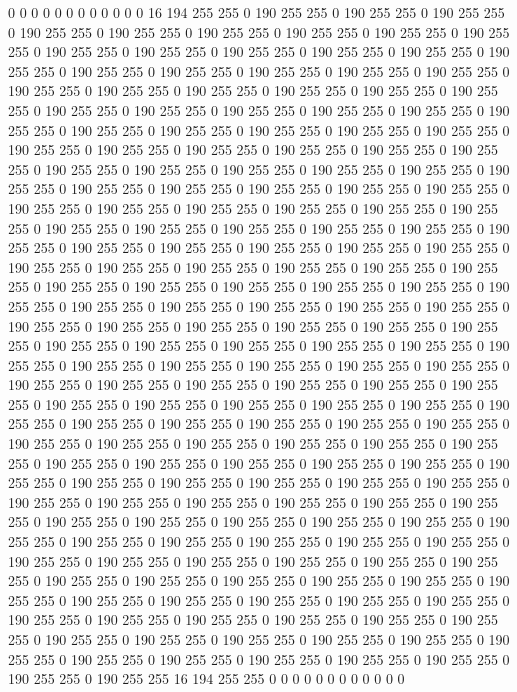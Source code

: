 0 0 0 0 0 0 0 0 0 0 0 0 16 194 255 255 0 190 255 255 0 190 255 255 0 190 255 255 0 190 255 255 0 190 255 255 0 190 255 255 0 190 255 255 0 190 255 255 0 190 255 255 0 190 255 255 0 190 255 255 0 190 255 255 0 190 255 255 0 190 255 255 0 190 255 255 0 190 255 255 0 190 255 255 0 190 255 255 0 190 255 255 0 190 255 255 0 190 255 255 0 190 255 255 0 190 255 255 0 190 255 255 0 190 255 255 0 190 255 255 0 190 255 255 0 190 255 255 0 190 255 255 0 190 255 255 0 190 255 255 0 190 255 255 0 190 255 255 0 190 255 255 0 190 255 255 0 190 255 255 0 190 255 255 0 190 255 255 0 190 255 255 0 190 255 255 0 190 255 255 0 190 255 255 0 190 255 255 0 190 255 255 0 190 255 255 0 190 255 255 
0 190 255 255 0 190 255 255 0 190 255 255 0 190 255 255 0 190 255 255 0 190 255 255 0 190 255 255 0 190 255 255 0 190 255 255 0 190 255 255 0 190 255 255 0 190 255 255 0 190 255 255 0 190 255 255 0 190 255 255 0 190 255 255 0 190 255 255 0 190 255 255 0 190 255 255 0 190 255 255 0 190 255 255 0 190 255 255 0 190 255 255 0 190 255 255 0 190 255 255 0 190 255 255 0 190 255 255 0 190 255 255 0 190 255 255 0 190 255 255 0 190 255 255 0 190 255 255 0 190 255 255 0 190 255 255 0 190 255 255 0 190 255 255 0 190 255 255 0 190 255 255 0 190 255 255 0 190 255 255 0 190 255 255 0 190 255 255 0 190 255 255 0 190 255 255 0 190 255 255 0 190 255 255 0 190 255 255 0 190 255 255 0 190 255 255 0 190 255 255 
0 190 255 255 0 190 255 255 0 190 255 255 0 190 255 255 0 190 255 255 0 190 255 255 0 190 255 255 0 190 255 255 0 190 255 255 0 190 255 255 0 190 255 255 0 190 255 255 0 190 255 255 0 190 255 255 0 190 255 255 0 190 255 255 0 190 255 255 0 190 255 255 0 190 255 255 0 190 255 255 0 190 255 255 0 190 255 255 0 190 255 255 0 190 255 255 0 190 255 255 0 190 255 255 0 190 255 255 0 190 255 255 0 190 255 255 0 190 255 255 0 190 255 255 0 190 255 255 0 190 255 255 0 190 255 255 0 190 255 255 0 190 255 255 0 190 255 255 0 190 255 255 0 190 255 255 0 190 255 255 0 190 255 255 0 190 255 255 0 190 255 255 0 190 255 255 0 190 255 255 0 190 255 255 0 190 255 255 0 190 255 255 0 190 255 255 0 190 255 255 
0 190 255 255 0 190 255 255 0 190 255 255 0 190 255 255 0 190 255 255 0 190 255 255 0 190 255 255 0 190 255 255 0 190 255 255 0 190 255 255 0 190 255 255 0 190 255 255 0 190 255 255 0 190 255 255 0 190 255 255 0 190 255 255 0 190 255 255 0 190 255 255 0 190 255 255 0 190 255 255 0 190 255 255 0 190 255 255 0 190 255 255 0 190 255 255 0 190 255 255 0 190 255 255 0 190 255 255 0 190 255 255 0 190 255 255 0 190 255 255 0 190 255 255 0 190 255 255 0 190 255 255 0 190 255 255 0 190 255 255 0 190 255 255 0 190 255 255 0 190 255 255 0 190 255 255 0 190 255 255 0 190 255 255 0 190 255 255 0 190 255 255 0 190 255 255 0 190 255 255 0 190 255 255 16 194 255 255 0 0 0 0 0 0 0 0 0 0 0 0 

